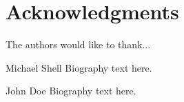 \documentclass[10pt,journal,compsoc]{IEEEtran}
\newif\ifpeerreview
\begin{document}
\ifpeerreview \else
\section*{Acknowledgments}
The authors would like to thank...
\fi






\ifpeerreview \else


\begin{IEEEbiography}{Michael Shell}
Biography text here.
\end{IEEEbiography}


\begin{IEEEbiographynophoto}{John Doe}
Biography text here.
\end{IEEEbiographynophoto}


\fi
\end{document}
